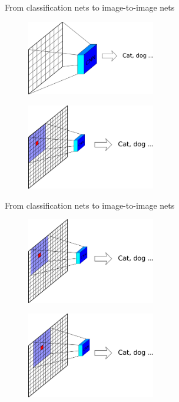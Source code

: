 \documentclass[xcolor=pdftex,dvipsnames,table,mathserif]{beamer}
\begin{document}
\begin{frame}{From classification nets to image-to-image nets}

      \begin{figure}
      \includegraphics[width=0.5\textwidth]{image_classif.png}
      \end{figure}

      \pause

      \begin{figure}
      \includegraphics[width=0.5\textwidth]{image_transf.png}
      \end{figure}


\end{frame}


\begin{frame}{From classification nets to image-to-image nets}

      \begin{figure}
      \includegraphics[width=0.5\textwidth]{image_transf1.png}
      \end{figure}

      \pause

      \begin{figure}
      \includegraphics[width=0.5\textwidth]{image_transf2.png}
      \end{figure}

\end{frame}
\end{document}
